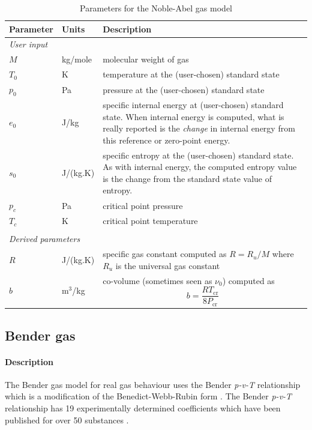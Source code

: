 \begin{table}[h]
\caption{Parameters for the Noble-Abel gas model}
\label{tab:na-params}
\begin{tabular}{llp{10cm}}
\toprule
Parameter & Units & Description \\ \midrule
\multicolumn{3}{l}{\textit{User input}} \\
$M$       & kg/mole & molecular weight of gas \\
$T_0$     & K      & temperature at the (user-chosen) standard state \\
$p_0$     & Pa     & pressure at the (user-chosen) standard state \\
$e_0$     & J/kg   & specific internal energy at (user-chosen) standard state.
                    When internal energy is computed, what is really 
                    reported is the \emph{change} in internal energy
                    from this reference or zero-point energy. \\
$s_0$     & J/(kg.K) & specific entropy at the (user-chosen) standard state.
                       As with internal energy, the computed entropy value
                       is the change from the standard state value of entropy. \\
$p_c$     & Pa     & critical point pressure \\
$T_c$     & K      & critical point temperature \\
 & & \\
\multicolumn{3}{l}{\textit{Derived parameters}} \\
$R$      & J/(kg.K) & specific gas constant computed as $R = R_u/M$ where
                      $R_u$ is the universal gas constant \\
$b$      & m$^3$/kg & co-volume (sometimes seen as $\nu_0$) computed as
                      \[ b = \frac{R T_{\text{cr}}}{8 P_{\text{cr}}} \] \\

\bottomrule
\end{tabular}
\end{table}

\subsection{Bender gas}
\label{sec:bender_gas}

\paragraph{Description}
The Bender gas model for real gas behaviour uses the Bender \cite{bender1975equations}
\textit{p-v-T} relationship which is a modification of the Benedict-Webb-Rubin
form \cite{sengers2000equations}.
The Bender \textit{p-v-T} relationship has 19 experimentally determined coefficients
which have been published for over 50 substances \cite{bender1970equations}
\cite{bender1975equations} \cite{platzer1990thermophysical} \cite{polt1992bender}
\cite{sievers1980equation}.

